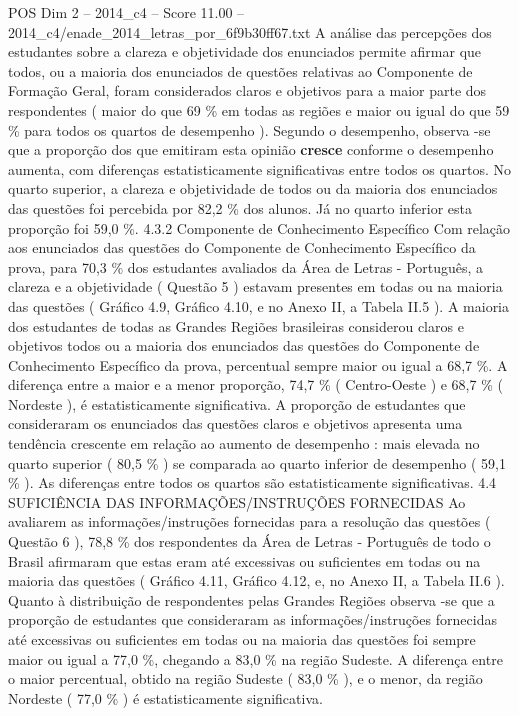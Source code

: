 \begin{textsample}{POS Dim 2 – 2014\_c4 – Score 11.00 – 2014\_c4/enade\_2014\_letras\_por\_6f9b30ff67.txt}
A análise das percepções dos estudantes sobre a clareza e objetividade dos enunciados permite afirmar que todos, ou a maioria dos enunciados de questões relativas ao Componente de Formação Geral, foram considerados claros e objetivos para a maior parte dos respondentes ( maior do que 69 \% em todas as regiões e maior ou igual do que 59 \% para todos os quartos de desempenho ).
Segundo o desempenho, observa -se que a proporção dos que emitiram esta opinião \textbf{cresce} conforme o desempenho aumenta, com diferenças estatisticamente significativas entre todos os quartos.
No quarto superior, a clareza e objetividade de todos ou da maioria dos enunciados das questões foi percebida por 82,2 \% dos alunos.
Já no quarto inferior esta proporção foi 59,0 \%. 4.3.2 Componente de Conhecimento Específico Com relação aos enunciados das questões do Componente de Conhecimento Específico da prova, para 70,3 \% dos estudantes avaliados da Área de Letras - Português, a clareza e a objetividade ( Questão 5 ) estavam presentes em todas ou na maioria das questões ( Gráfico 4.9, Gráfico 4.10, e no Anexo II, a Tabela II.5 ).
A maioria dos estudantes de todas as Grandes Regiões brasileiras considerou claros e objetivos todos ou a maioria dos enunciados das questões do Componente de Conhecimento Específico da prova, percentual sempre maior ou igual a 68,7 \%.
A diferença entre a maior e a menor proporção, 74,7 \% ( Centro-Oeste ) e 68,7 \% ( Nordeste ), é estatisticamente significativa.
A proporção de estudantes que consideraram os enunciados das questões claros e objetivos apresenta uma tendência crescente em relação ao aumento de desempenho : mais elevada no quarto superior ( 80,5 \% ) se comparada ao quarto inferior de desempenho ( 59,1 \% ).
As diferenças entre todos os quartos são estatisticamente significativas. 4.4 SUFICIÊNCIA DAS INFORMAÇÕES/INSTRUÇÕES FORNECIDAS Ao avaliarem as informações/instruções fornecidas para a resolução das questões ( Questão 6 ), 78,8 \% dos respondentes da Área de Letras - Português de todo o Brasil afirmaram que estas eram até excessivas ou suficientes em todas ou na maioria das questões ( Gráfico 4.11, Gráfico 4.12, e, no Anexo II, a Tabela II.6 ).
Quanto à distribuição de respondentes pelas Grandes Regiões observa -se que a proporção de estudantes que consideraram as informações/instruções fornecidas até excessivas ou suficientes em todas ou na maioria das questões foi sempre maior ou igual a 77,0 \%, chegando a 83,0 \% na região Sudeste.
A diferença entre o maior percentual, obtido na região Sudeste ( 83,0 \% ), e o menor, da região Nordeste ( 77,0 \% ) é estatisticamente significativa.

\end{textsample}
